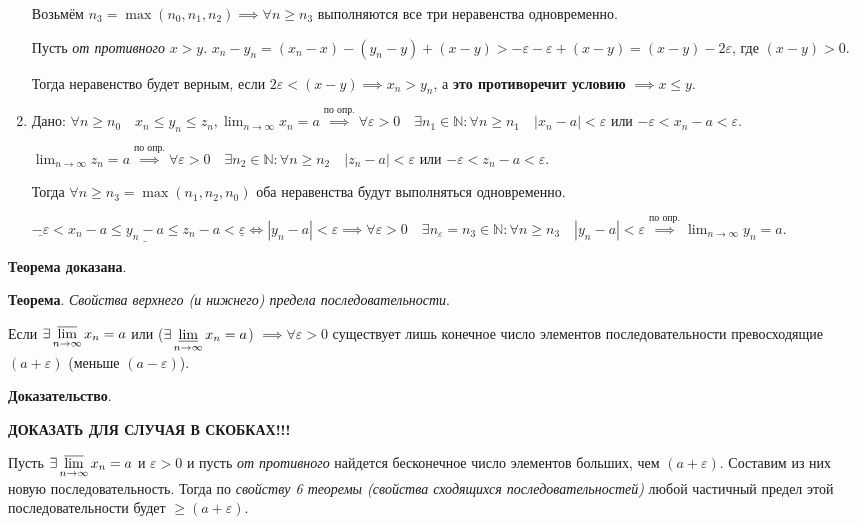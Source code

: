 \documentclass[a4paper,oneside]{article}
\newcommand{\bydef}{\stackrel{\text{по опр.}}{\implies}} %
\newcommand{\parspace}{\vspace{10pt}}
\newcommand{\dslim}{\displaystyle\lim}
\newcommand{\dslimn}{\dslim_{n \to \infty}}
\begin{document}
\begin{enumerate}
    Возьмём $n_3 = \max (n_0, n_1, n_2) \implies \forall n \ge n_3$ выполняются
    все три неравенства одновременно.

    Пусть \textit{от противного} $x > y$. 
    $x_n - y_n = (x_n - x) - (y_n - y) + (x - y) > 
    -\varepsilon - \varepsilon + (x - y) = (x - y) - 2 \varepsilon$, где $(x - y) > 0$.

    Тогда неравенство будет верным, если $2 \varepsilon < (x - y) \implies x_n > y_n$,
    а \textbf{это противоречит условию} $\implies x \le y$.

    \item Дано: $\forall n \ge n_0 \quad x_n \le y_n \le z_n, 
    \dslimn x_n = a \bydef
    \forall \varepsilon > 0 \quad \exists n_1 \in \mathbb{N}:
    \forall n \ge n_1 \quad |x_n - a| < \varepsilon$ или
    $-\varepsilon < x_n - a < \varepsilon$.
    
    $\dslimn z_n = a \bydef
    \forall \varepsilon > 0 \quad \exists n_2 \in \mathbb{N}:
    \forall n \ge n_2 \quad |z_n - a| < \varepsilon$ или
    $-\varepsilon < z_n - a < \varepsilon$.

    Тогда $\forall n \ge n_3 = \max (n_1, n_2, n_0)$ оба неравенства
    будут выполняться одновременно.

    $\underline{-\varepsilon} < x_n - a \le \underline{y_n - a} \le
    z_n - a < \underline{\varepsilon} \Leftrightarrow |y_n - a| < \varepsilon
    \implies \forall \varepsilon > 0 \quad \exists n_\varepsilon = n_3 \in \mathbb{N}:
    \forall n \ge n_3 \quad |y_n - a| < \varepsilon \bydef 
    \dslimn y_n = a$.
\end{enumerate}

\textbf{Теорема доказана}.

\parspace

\textbf{Теорема}. \textit{Свойства верхнего (и нижнего) предела последовательности}.

Если $\exists \displaystyle\varlimsup_{n \to \infty} x_n = a$ 
или ($\exists \displaystyle\varliminf_{n \to \infty} x_n = a$)
$\implies \forall \varepsilon > 0$ существует лишь конечное число элементов
последовательности превосходящие $(a + \varepsilon)$ (меньше $(a - \varepsilon)$).

\textbf{Доказательство}.

\textbf{ДОКАЗАТЬ ДЛЯ СЛУЧАЯ В СКОБКАХ!!!}

Пусть $\exists \displaystyle\varlimsup_{n \to \infty} x_n = a$ и $\varepsilon > 0$ и
пусть \textit{от противного} найдется бесконечное число элементов больших, чем
$(a + \varepsilon)$. Составим из них новую последовательность. Тогда по 
\textit{свойству 6 теоремы (свойства сходящихся последовательностей)} любой
частичный предел этой последовательности будет $\ge (a + \varepsilon)$.
\end{document}
